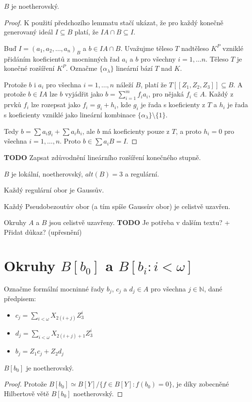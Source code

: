 \documentclass[11pt,a4paper]{article}
\newcommand\m[1]{\mathbb { #1 }} %
\theoremstyle{definition}
\theoremstyle{plain}
\begin{document}
\veta $B$ je noetherovský.
\begin{proof}
	K použití předchozího lemmatu stačí ukázat, že pro každý konečně generovaný
	ideál $I \subseteq B$ platí, že $IA \cap B \subseteq I$.

	Buď $I = (a_1, a_2, \dots, a_n)_B$ a $b \in IA \cap B$. Uvažujme těleso $T$
	nadtěleso $K^P$ vzniklé přidáním koeficientů z mocninných řad $a_i$ a $b$
	pro všechny $i = 1, \dots n$. Těleso $T$ je konečné rozšíření $K^P$.
	Označme $\{\alpha_\lambda\}$ lineární bází $T$ nad $K$.

	Protože $b$ i $a_i$ pro všechna $i=1,\dots,n$ náleží $B$, platí že
	$T[[Z_1,Z_2,Z_3]] \subseteq B$. A protože $b \in IA$ lze $b$ vyjádřit jako
	$b = \sum_{i = 1}^m f_i a_i$, pro nějaká $f_i \in A$. Každý z prvků $f_i$
	lze rozepsat jako $f_i = g_i + h_i$, kde $g_i$ je řada s koeficienty z $T$
	a $h_i$ je řada s koeficienty vzniklé jako lineární kombinace
	$\{\alpha_\lambda\} \setminus \{1\}$.

	Tedy $b = \sum a_ig_i + \sum a_ih_i$, ale $b$ má koeficienty pouze z $T$, a
	proto $h_i = 0$ pro všechna $i = 1,\dots,n$. Proto $b \in \sum a_iB = I$.
\end{proof}
\textbf{TODO} Zapsat zdůvodnění lineárního rozšíření konečného stupně.

\veta $B$ je lokální, noetherovský, $alt(B) = 3$ a regulární.

\tvrzeni[Fakt] Každý regulární obor je Gaussův.

\tvrzeni[Fakt] Každý Pseudobezoutův obor (a tím spíše Gaussův obor) je celistvě uzavřen.

\dusledek Okruhy $A$ a $B$ jsou celistvě uzavřeny.
\textbf{TODO} Je potřeba v dalším textu? + Přidat důkaz? (upřesnění)

\section{Okruhy $B[b_0]$ a $B[b_i : i < \omega]$}
 Označme formální mocninné řady $b_j$, $c_j$ a $d_j \in A$ pro všechna
$j \in \m N$, dané předpisem:
\begin{itemize}
	\item $c_j = \sum_{i < \omega} X_{2(i + j)} Z^i_3$
	\item $d_j = \sum_{i < \omega} X_{2(i + j) + 1} Z^i_3$
	\item $b_j = Z_1c_j + Z_2d_j$
\end{itemize}

\veta $B[b_0]$ je noetherovský.
\begin{proof}
	Protože $B[b_0] \simeq B[Y] / \{ f \in B[Y] : f(b_0) = 0 \}$, je díky
	zobecněné Hilbertově větě $B[b_0]$ noetherovský.
\end{proof}
\end{document}
